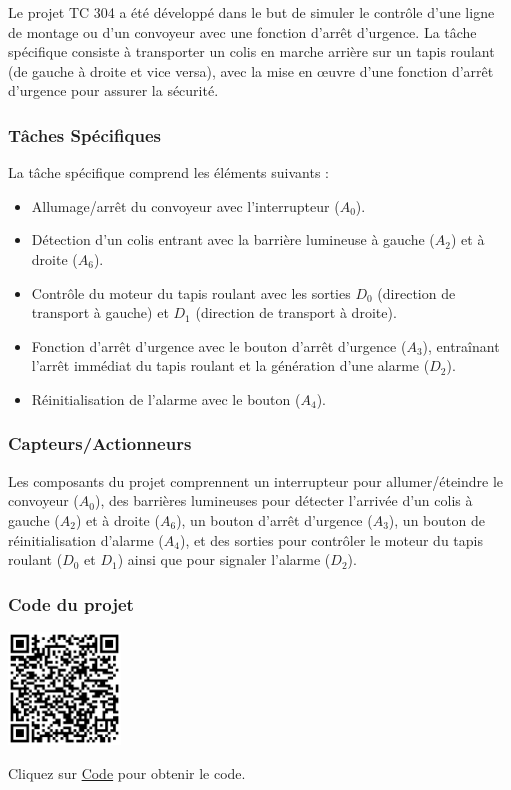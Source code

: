 \documentclass[a4paper,12pt]{report}
\begin{document}
Le projet TC 304 a été développé dans le but de simuler le contrôle d'une ligne de montage ou d'un convoyeur avec une fonction d'arrêt d'urgence. La tâche spécifique consiste à transporter un colis en marche arrière sur un tapis roulant (de gauche à droite et vice versa), avec la mise en œuvre d'une fonction d'arrêt d'urgence pour assurer la sécurité.

\subsubsection{Tâches Spécifiques}

La tâche spécifique comprend les éléments suivants :
\begin{itemize}
    \item Allumage/arrêt du convoyeur avec l'interrupteur (\(A_0\)).
    \item Détection d'un colis entrant avec la barrière lumineuse à gauche (\(A_2\)) et à droite (\(A_6\)).
    \item Contrôle du moteur du tapis roulant avec les sorties \(D_0\) (direction de transport à gauche) et \(D_1\) (direction de transport à droite).
    \item Fonction d'arrêt d'urgence avec le bouton d'arrêt d'urgence (\(A_3\)), entraînant l'arrêt immédiat du tapis roulant et la génération d'une alarme (\(D_2\)).
    \item Réinitialisation de l'alarme avec le bouton (\(A_4\)).
\end{itemize}

\subsubsection{Capteurs/Actionneurs}

Les composants du projet comprennent un interrupteur pour allumer/éteindre le convoyeur (\(A_0\)), des barrières lumineuses pour détecter l'arrivée d'un colis à gauche (\(A_2\)) et à droite (\(A_6\)), un bouton d'arrêt d'urgence (\(A_3\)), un bouton de réinitialisation d'alarme (\(A_4\)), et des sorties pour contrôler le moteur du tapis roulant (\(D_0\) et \(D_1\)) ainsi que pour signaler l'alarme (\(D_2\)).

\subsubsection{Code du projet}

\begin{minipage}{0.5\textwidth}
    \includegraphics[height=3cm]{Code TC304.png}
\end{minipage}%
\begin{minipage}{0.5\textwidth}
    Cliquez sur \href{https://github.com/DexterTaha/Controllino-PLC-Sample/blob/main/TC300/TC304_Ligne_d'assemblage/TC304_Ligne_d'assemblage.ino}{Code} pour obtenir le code.
\end{minipage}
\end{document}

